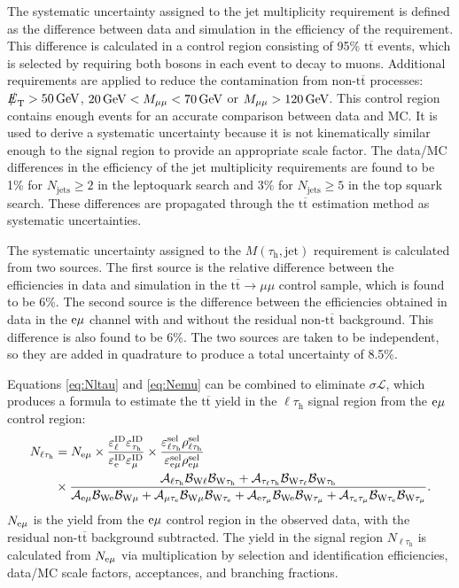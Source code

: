 \documentclass[12pt]{thesis}  %
\newcommand{\tauh}{\ensuremath{\tau_{\text{h}}}\xspace}
\newcommand{\Pe}{\ensuremath{\cmsSymbolFace{e}}\xspace}
\newcommand{\emu}{\ensuremath{\Pe\mu}\xspace}
\newcommand{\ltau}{\ensuremath{\ell\tauh}\xspace}
\def\eslash{\ensuremath{{\hbox{$E$\kern-0.6em\lower-.05ex\hbox{/}\kern0.10em}}}}
\def\met{\mbox{$\eslash_\text{T}$}\xspace} %
\renewcommand{\ttbar}{\ensuremath{\mathrm{t}\overline{\mathrm{t}}}\xspace}
\def\MassTJ{\ensuremath{M(\tauh,\text{jet})}\xspace}
\begin{document}
The systematic uncertainty assigned to the jet multiplicity requirement is defined as the difference between data and simulation in the efficiency of the requirement. This difference is calculated in a control region consisting of 95\% \ttbar events, which is selected by requiring both \W bosons in each event to decay to muons. Additional requirements are applied to reduce the contamination from non-\ttbar processes: $\met > 50\GeV$, $20\,\text{Ge\hspace{-.08em}V} < M_{\mu\mu} < 70\,\text{Ge\hspace{-.08em}V}$ or $M_{\mu\mu} > 120\,\text{Ge\hspace{-.08em}V}$. This control region contains enough events for an accurate comparison between data and MC. It is used to derive a systematic uncertainty because it is not kinematically similar enough to the signal region to provide an appropriate scale factor. The data/MC differences in the efficiency of the jet multiplicity requirements are found to be 1\% for $N_{\text{jets}}\geq2$ in the leptoquark search and 3\% for $N_{\text{jets}}\geq5$ in the top squark search. These differences are propagated through the \ttbar estimation method as systematic uncertainties.

The systematic uncertainty assigned to the \MassTJ requirement is calculated from two sources. The first source is the relative difference between the efficiencies in data and simulation in the $\ttbar \rightarrow \mu\mu$ control sample, which is found to be 6\%. The second source is the difference between the efficiencies obtained in data in the $\emu$ channel with and without the residual non-\ttbar background. This difference is also found to be 6\%. The two sources are taken to be independent, so they are added in quadrature to produce a total uncertainty of 8.5\%.

Equations \eqref{eq:Nltau} and \eqref{eq:Nemu} can be combined to eliminate $\sigma\mathcal{L}$, which produces a formula to estimate the \ttbar yield in the \ltau signal region from the \emu control region:
\begin{align}
\label{eq:ttbartot}
N_{\ltau} &= N_{\emu} \times \frac{\El\Eth}{\Ee\Emu} \times \frac{\varepsilon^{\text{sel}}_{\ltau}\rho^{\text{sel}}_{\ltau}}{\varepsilon^{\text{sel}}_{\emu}\rho^{\text{sel}}_{\emu}} \nonumber \\
&\times \frac{\Alth\Bl\Bth + \Atlth\Btl\Bth}{\Aem\Be\Bm + \Amte\Bm\Bte + \Aetm\Be\Btm + \Atetm\Bte\Btm}.
\end{align}
$N_{\emu}$ is the yield from the \emu control region in the observed data, with the residual non-\ttbar background subtracted. The yield in the signal region $N_{\ltau}$ is calculated from $N_{\emu}$ via multiplication by selection and identification efficiencies, data/MC scale factors, acceptances, and branching fractions.
\end{document}
